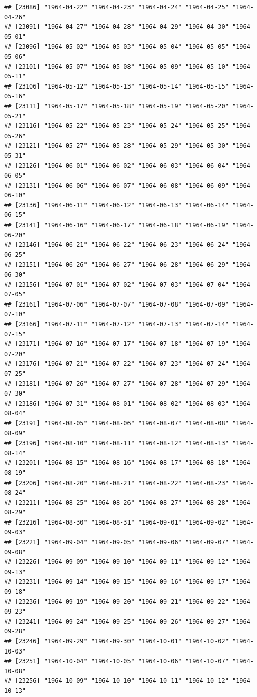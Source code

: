 \documentclass{article}\usepackage[]{graphicx}\usepackage[]{color}
\makeatletter
\newenvironment{kframe}{%
 \def\at@end@of@kframe{}%
 \ifinner\ifhmode%
  \def\at@end@of@kframe{\end{minipage}}%
  \begin{minipage}{\columnwidth}%
 \fi\fi%
 \def\FrameCommand##1{\hskip\@totalleftmargin \hskip-\fboxsep
 \colorbox{shadecolor}{##1}\hskip-\fboxsep
     \hskip-\linewidth \hskip-\@totalleftmargin \hskip\columnwidth}%
 \MakeFramed {\advance\hsize-\width
   \@totalleftmargin\z@ \linewidth\hsize
   \@setminipage}}%
 {\par\unskip\endMakeFramed%
 \at@end@of@kframe}
\newenvironment{knitrout}{}{} %
\makeatother
\begin{document}
\begin{description}
\begin{knitrout}
\begin{kframe}
\begin{verbatim}
## [23086] "1964-04-22" "1964-04-23" "1964-04-24" "1964-04-25" "1964-04-26"
## [23091] "1964-04-27" "1964-04-28" "1964-04-29" "1964-04-30" "1964-05-01"
## [23096] "1964-05-02" "1964-05-03" "1964-05-04" "1964-05-05" "1964-05-06"
## [23101] "1964-05-07" "1964-05-08" "1964-05-09" "1964-05-10" "1964-05-11"
## [23106] "1964-05-12" "1964-05-13" "1964-05-14" "1964-05-15" "1964-05-16"
## [23111] "1964-05-17" "1964-05-18" "1964-05-19" "1964-05-20" "1964-05-21"
## [23116] "1964-05-22" "1964-05-23" "1964-05-24" "1964-05-25" "1964-05-26"
## [23121] "1964-05-27" "1964-05-28" "1964-05-29" "1964-05-30" "1964-05-31"
## [23126] "1964-06-01" "1964-06-02" "1964-06-03" "1964-06-04" "1964-06-05"
## [23131] "1964-06-06" "1964-06-07" "1964-06-08" "1964-06-09" "1964-06-10"
## [23136] "1964-06-11" "1964-06-12" "1964-06-13" "1964-06-14" "1964-06-15"
## [23141] "1964-06-16" "1964-06-17" "1964-06-18" "1964-06-19" "1964-06-20"
## [23146] "1964-06-21" "1964-06-22" "1964-06-23" "1964-06-24" "1964-06-25"
## [23151] "1964-06-26" "1964-06-27" "1964-06-28" "1964-06-29" "1964-06-30"
## [23156] "1964-07-01" "1964-07-02" "1964-07-03" "1964-07-04" "1964-07-05"
## [23161] "1964-07-06" "1964-07-07" "1964-07-08" "1964-07-09" "1964-07-10"
## [23166] "1964-07-11" "1964-07-12" "1964-07-13" "1964-07-14" "1964-07-15"
## [23171] "1964-07-16" "1964-07-17" "1964-07-18" "1964-07-19" "1964-07-20"
## [23176] "1964-07-21" "1964-07-22" "1964-07-23" "1964-07-24" "1964-07-25"
## [23181] "1964-07-26" "1964-07-27" "1964-07-28" "1964-07-29" "1964-07-30"
## [23186] "1964-07-31" "1964-08-01" "1964-08-02" "1964-08-03" "1964-08-04"
## [23191] "1964-08-05" "1964-08-06" "1964-08-07" "1964-08-08" "1964-08-09"
## [23196] "1964-08-10" "1964-08-11" "1964-08-12" "1964-08-13" "1964-08-14"
## [23201] "1964-08-15" "1964-08-16" "1964-08-17" "1964-08-18" "1964-08-19"
## [23206] "1964-08-20" "1964-08-21" "1964-08-22" "1964-08-23" "1964-08-24"
## [23211] "1964-08-25" "1964-08-26" "1964-08-27" "1964-08-28" "1964-08-29"
## [23216] "1964-08-30" "1964-08-31" "1964-09-01" "1964-09-02" "1964-09-03"
## [23221] "1964-09-04" "1964-09-05" "1964-09-06" "1964-09-07" "1964-09-08"
## [23226] "1964-09-09" "1964-09-10" "1964-09-11" "1964-09-12" "1964-09-13"
## [23231] "1964-09-14" "1964-09-15" "1964-09-16" "1964-09-17" "1964-09-18"
## [23236] "1964-09-19" "1964-09-20" "1964-09-21" "1964-09-22" "1964-09-23"
## [23241] "1964-09-24" "1964-09-25" "1964-09-26" "1964-09-27" "1964-09-28"
## [23246] "1964-09-29" "1964-09-30" "1964-10-01" "1964-10-02" "1964-10-03"
## [23251] "1964-10-04" "1964-10-05" "1964-10-06" "1964-10-07" "1964-10-08"
## [23256] "1964-10-09" "1964-10-10" "1964-10-11" "1964-10-12" "1964-10-13"

\end{verbatim}
\end{kframe}
\end{knitrout}
\end{description}
\end{document}
